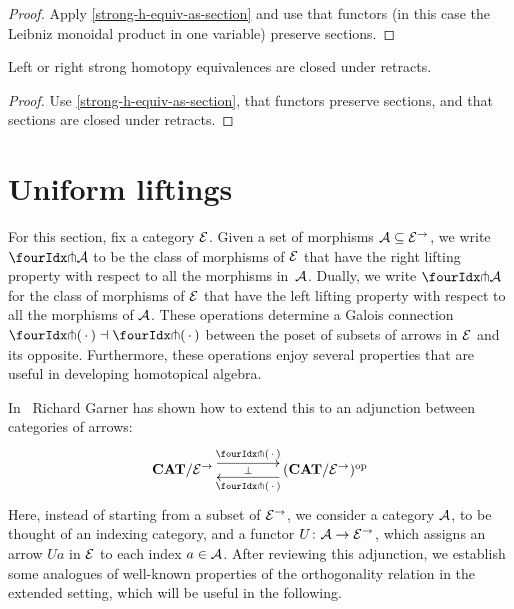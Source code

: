 \documentclass[reqno,10pt,a4paper,oneside]{amsart}
\begin{document}
\begin{proof}
Apply \cref{strong-h-equiv-as-section} and use that functors (in this case the Leibniz monoidal product in one variable) preserve sections.
\end{proof}

\begin{proposition}
\label{strong-h-equiv-closed-under-retract}
Left or right strong homotopy equivalences are closed under retracts.
\end{proposition}

\begin{proof}
Use \cref{strong-h-equiv-as-section},  that functors preserve sections, and that  sections are closed under retracts.
\end{proof}

\section{Uniform liftings}

For this section, fix a category $\catE$. Given a set of morphisms $\cal{A} \subseteq \catE^\to$, we 
write $\liftr{\cal{A}}$ to be the class of morphisms of $\catE$ that have 
the right lifting property with respect to all the morphisms in~$\cal{A}$. Dually, we write $\liftl{\cal{A}}$ for the class of morphisms of $\catE$ that have the left lifting
property with respect to all the morphisms of $\cal{A}$. These operations determine a Galois connection $\liftr{\brarghole} \dashv \liftl{\brarghole}$ between the poset of subsets of arrows in $\catE$ and its opposite. Furthermore, these operations enjoy several properties that are useful in developing homotopical algebra.

\medskip

In~\cite{garner:small-object-argument} Richard Garner has shown how to extend this to an adjunction between categories of arrows:
\begin{equation}
\label{garner-adjunction}
\begin{gathered}
\xymatrix@C+2em{
  \CAT/\catE^{\to}
  \ar@<5pt>[r]^-{\liftl{\brarghole}}
  \ar@{}[r]|-{\bot}
&
  (\CAT/\catE^{\to})^{\op}
  \ar@<5pt>[l]^-{\liftr{\brarghole}}
}
\end{gathered}
\end{equation}
Here, instead of starting from a subset of $\catE^\to$, we consider a category $\cal{A}$, to be thought of an indexing category, and a functor $U \co \cal{A} \to \catE^\to$, which assigns an arrow $U a$ in $\catE$ to each index $a \in \cal{A}$. After reviewing this adjunction, we establish some analogues of well-known properties of the orthogonality relation in the extended setting, which will be useful in the following.
 
\end{document}
